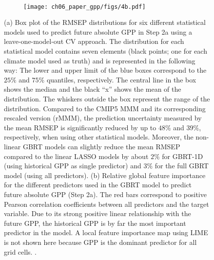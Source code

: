 \begin{figure}[!t]
  \centering
  \begin{subfigure}[b]{\SubfigureWidth{}}
    \caption{}
    \label{fig:06:step2a_ml_inference:a}
  \end{subfigure}
  ~
  \begin{subfigure}[b]{\SubfigureWidth{}}
    \texttt{[image: ch06\_paper\_gpp/figs/4b.pdf]}
    \caption{}
    \label{fig:06:step2a_ml_inference:b}
  \end{subfigure}
  \caption[
    Prediction error in a leave-one-model-out \acl{CV} setup and feature
    importance of our \acl{ML} approach to constrain projected absolute
    \acf{GPP} at the end of the  century in Step 2a.
  ]{
    (a) Box plot of the \acf{RMSEP} distributions for six different statistical
    models used to predict future absolute \acf{GPP} in Step 2a using a
    leave-one-model-out \acl{CV} approach. The distribution for each
    statistical model contains seven elements (black points; one for each
    climate model used as truth) and is represented in the following way: The
    lower and upper limit of the blue boxes correspond to the $25 \unit{\%}$
    and $75 \unit{\%}$ quantiles, respectively. The central line in the box
    shows the median and the black \enquote{x} shows the mean of the
    distribution. The whiskers outside the box represent the range of the
    distribution. Compared to the \acs{CMIP}5 \acf{MMM} and its corresponding
    rescaled version (r\acs{MMM}), the prediction uncertainty measured by the
    mean \acs{RMSEP} is significantly reduced by up to $48 \unit{\%}$ and $39
    \unit{\%}$, respectively, when using other statistical models. Moreover,
    the non-linear \acf{GBRT} models can slightly reduce the mean \acs{RMSEP}
    compared to the linear \acf{LASSO} models by about $2 \unit{\%}$ for
    \acs{GBRT}-1D (using historical \acs{GPP} as single predictor) and $3
    \unit{\%}$ for the full \acs{GBRT} model (using all predictors). (b)
    Relative global feature importance for the different predictors used in the
    \acs{GBRT} model to predict future absolute \acs{GPP} (Step 2a). The red
    bars correspond to positive Pearson correlation coefficients between all
    predictors and the target variable. Due to its strong positive linear
    relationship with the future \acs{GPP}, the historical \acs{GPP} is by far
    the most important predictor in the model. A local feature importance map
    using \acf{LIME} is not shown here because \acs{GPP} is the dominant
    predictor for all grid cells. .
  }
  \label{fig:06:step2a_ml_inference}
\end{figure}

